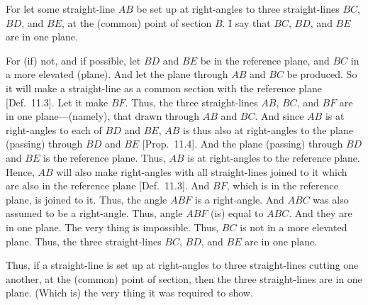 \begin{Parallel}{}{}
{
\centerline{}

For let some straight-line $AB$ be set up at right-angles
to three straight-lines $BC$, $BD$, and $BE$, at the (common) point of
section $B$. I say that $BC$, $BD$, and $BE$ are in  one plane.

For (if) not, and if possible, let $BD$ and $BE$ be in the reference plane,
and $BC$ in a more elevated (plane).  And let the plane through $AB$ and
$BC$ be produced. So it will make a straight-line as a
common section with the reference plane [Def.~11.3]. 
Let it make $BF$. Thus, the three straight-lines $AB$, $BC$, and $BF$
are in one plane---(namely), that drawn through $AB$ and $BC$. And since
$AB$ is at right-angles to each of $BD$ and $BE$, $AB$ is thus also at right-angles to the plane (passing) through $BD$ and $BE$ [Prop.~11.4]. And the plane (passing)
through $BD$ and $BE$ is the reference plane. Thus, $AB$ is at
right-angles to the reference plane. Hence, $AB$ will also make right-angles
with all straight-lines joined to it which are also in the reference plane [Def.~11.3].
And $BF$, which is in the reference plane, is joined to  it. Thus, the angle
$ABF$ is a right-angle. And $ABC$ was also assumed to be a right-angle.
Thus, angle $ABF$ (is) equal to $ABC$. And they are in one
plane. The very thing is impossible. Thus, $BC$ is not in a more elevated
plane. Thus, the three straight-lines $BC$, $BD$, and $BE$ are in one plane.

Thus, if a straight-line is set up at right-angles to three straight-lines cutting
one another, at the (common) point of section, then the three straight-lines
are in one plane. (Which is) the very thing it was required to show.}
\end{Parallel}

